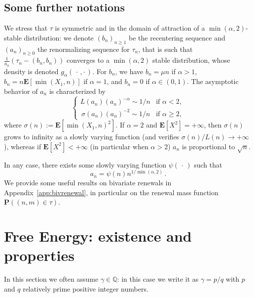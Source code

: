 \documentclass[AHL,Unicode,longabstracts]{cedram}
\newcommand{\ga}{\alpha}
\newcommand{\bP}{\ensuremath{\mathbf{P}}}
\newcommand{\bE}{\ensuremath{\mathbf{E}}}
\newcommand{\bbQ}{\ensuremath{\mathbb{Q}}}
\begin{document}
\subsection{Some further notations}\label{sec:defan}

We stress that $\tau$ is symmetric and in the domain of attraction of a $\min(\ga,2)$-stable distribution: we denote $(b_n)_{n\geq 1}$ be the recentering sequence and ${(a_n)}_{n \ge 0}$ the renormalizing sequence for $\tau_n$, that is such that $\tfrac{1}{a_n} (\tau_n - (b_n,b_n))$ converges to a $\min(\ga,2)$ stable distribution, whose density is denoted $g_\ga({\,\cdot\,,\cdot\,})$. For $b_n$, we have $b_n=\mu n$ if $\ga>1$, $b_n= n\bE[\min(X_1, n)]$ if $\ga=1$, and $b_n=0$ if $\ga \in(0,1)$. The asymptotic behavior of $a_n$ is characterized by
\begin{equation}\label{def:an}
\begin{cases}
L(a_n) (a_n)^{-\ga} \sim 1/n &\text{if } \ga<2,\\
\,\sigma(a_n) (a_n)^{-2} \sim 1/n &\text{if } \ga\geq 2,
\end{cases}
\end{equation}
where $\sigma(n):=\bE[\min(X_1, n)^2]$. If $\ga = 2$ and $\bE[X^2]=+\infty$, then $\sigma(n)$ grows to infinity as a slowly varying function (and verifies $\sigma(n)/L(n) \to +\infty$), whereas if $\bE[X^2]<+\infty$ (in particular when $\ga>2$) $a_n$ is proportional to $\sqrt{n}$.

In any case, there exists some slowly varying function $\psi({\,\cdot\,})$ such that
\begin{equation}
a_n = \psi(n) n^{1/\min(\ga, 2)}\,.\label{an}
\end{equation}
We provide some useful results on bivariate renewals in Appendix~\ref{app:bivrenewal}, in particular on the renewal mass function $\bP((n,m)\in\tau)$.


\section{Free Energy: existence and properties}\label{sec:existence}

In this section we often assume $\gamma\in \bbQ$: in this case we write it as $\gamma=p/q$ with $p$ and $q$ relatively prime positive integer numbers.
\end{document}

